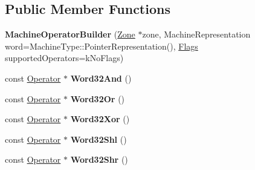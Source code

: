 \subsection*{Public Member Functions}
\begin{DoxyCompactItemize}
\item 
{\bfseries Machine\+Operator\+Builder} (\hyperlink{classv8_1_1internal_1_1_zone}{Zone} $\ast$zone, Machine\+Representation word=Machine\+Type\+::\+Pointer\+Representation(), \hyperlink{classv8_1_1base_1_1_flags}{Flags} supported\+Operators=k\+No\+Flags)\hypertarget{classv8_1_1internal_1_1compiler_1_1_machine_operator_builder_aa67b8d0d99d70ea0269027ab876d831c}{}\label{classv8_1_1internal_1_1compiler_1_1_machine_operator_builder_aa67b8d0d99d70ea0269027ab876d831c}

\item 
const \hyperlink{classv8_1_1internal_1_1compiler_1_1_operator}{Operator} $\ast$ {\bfseries Word32\+And} ()\hypertarget{classv8_1_1internal_1_1compiler_1_1_machine_operator_builder_a87bdea608df015d88c3e6ef48a596002}{}\label{classv8_1_1internal_1_1compiler_1_1_machine_operator_builder_a87bdea608df015d88c3e6ef48a596002}

\item 
const \hyperlink{classv8_1_1internal_1_1compiler_1_1_operator}{Operator} $\ast$ {\bfseries Word32\+Or} ()\hypertarget{classv8_1_1internal_1_1compiler_1_1_machine_operator_builder_a0b34213228599fac9e11434cb1e400ac}{}\label{classv8_1_1internal_1_1compiler_1_1_machine_operator_builder_a0b34213228599fac9e11434cb1e400ac}

\item 
const \hyperlink{classv8_1_1internal_1_1compiler_1_1_operator}{Operator} $\ast$ {\bfseries Word32\+Xor} ()\hypertarget{classv8_1_1internal_1_1compiler_1_1_machine_operator_builder_a80003ce43ec0605cfb5500bfa1e4b3b2}{}\label{classv8_1_1internal_1_1compiler_1_1_machine_operator_builder_a80003ce43ec0605cfb5500bfa1e4b3b2}

\item 
const \hyperlink{classv8_1_1internal_1_1compiler_1_1_operator}{Operator} $\ast$ {\bfseries Word32\+Shl} ()\hypertarget{classv8_1_1internal_1_1compiler_1_1_machine_operator_builder_a80fcd3efbedaf3ba65c41053cf87d97f}{}\label{classv8_1_1internal_1_1compiler_1_1_machine_operator_builder_a80fcd3efbedaf3ba65c41053cf87d97f}

\item 
const \hyperlink{classv8_1_1internal_1_1compiler_1_1_operator}{Operator} $\ast$ {\bfseries Word32\+Shr} ()\hypertarget{classv8_1_1internal_1_1compiler_1_1_machine_operator_builder_abcb1ddcdf6f06114af0019a295a03c47}{}\label{classv8_1_1internal_1_1compiler_1_1_machine_operator_builder_abcb1ddcdf6f06114af0019a295a03c47}


\end{DoxyCompactItemize}
